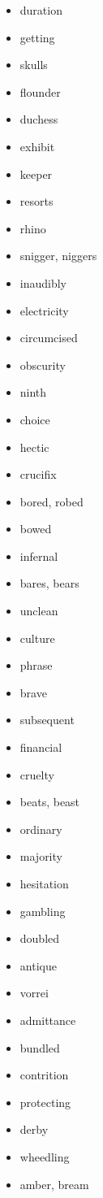 \documentclass{article}
\begin{document}
\begin{itemize}
    \item duration
    \item getting
    \item skulls
    \item flounder
    \item duchess
    \item exhibit
    \item keeper
    \item resorts
    \item rhino
    \item snigger, niggers
    \item inaudibly
    \item electricity
    \item circumcised
    \item obscurity
    \item ninth
    \item choice
    \item hectic
    \item crucifix
    \item bored, robed
    \item bowed
    \item infernal
    \item bares, bears
    \item unclean
    \item culture
    \item phrase
    \item brave
    \item subsequent
    \item financial
    \item cruelty
    \item beats, beast
    \item ordinary
    \item majority
    \item hesitation
    \item gambling
    \item doubled
    \item antique
    \item vorrei
    \item admittance
    \item bundled
    \item contrition
    \item protecting
    \item derby
    \item wheedling
    \item amber, bream

\end{itemize}
\end{document}
